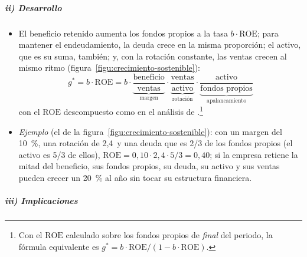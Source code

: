 \documentclass[11pt]{article}
\begin{document}
\subparagraph{ii) Desarrollo}

\begin{itemize}
\item El beneficio retenido aumenta los fondos propios a la tasa $b\cdot\mathrm{ROE}$; para mantener el endeudamiento, la deuda crece en la misma proporción; el activo, que es su suma, también; y, con la rotación constante, las ventas crecen al mismo ritmo (figura~\ref{figu:crecimiento-sostenible}):
  \begin{equation}\label{eq:crecimiento-sostenible}
  g^{*}=b\cdot\mathrm{ROE}=b\cdot\underbrace{\frac{\text{beneficio}}{\text{ventas}}}_{\text{margen}}\cdot\underbrace{\frac{\text{ventas}}{\text{activo}}}_{\text{rotación}}\cdot\underbrace{\frac{\text{activo}}{\text{fondos propios}}}_{\text{apalancamiento}}
  \end{equation}
  con el $\mathrm{ROE}$ descompuesto como en el análisis de  .\footnote{Con el $\mathrm{ROE}$ calculado sobre los fondos propios de \emph{final} del periodo, la fórmula equivalente es $g^{*}=b\cdot\mathrm{ROE}/(1-b\cdot\mathrm{ROE})$\nocite{Higgins1977How}.}
\item \emph{Ejemplo} (el de la figura~\ref{figu:crecimiento-sostenible}): con un margen del 10~\%, una rotación de 2,4~y una deuda que es 2/3 de los fondos propios (el activo es 5/3 de ellos), $\mathrm{ROE}=0{,}10\cdot2{,}4\cdot5/3=0{,}40$; si la empresa retiene la mitad del beneficio, sus fondos propios, su deuda, su activo y sus ventas pueden crecer un 20~\% al año sin tocar su estructura financiera.
\end{itemize}

\begin{infografia}[H]
\centering
\caption{El crecimiento financieramente sostenible: del beneficio retenido a las ventas}\label{figu:crecimiento-sostenible}
\end{infografia}

\subparagraph{iii) Implicaciones}
\end{document}
